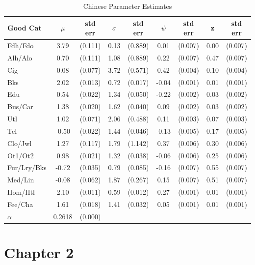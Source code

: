 \begin{table}[!ht]
    \centering
	\begin{tabular}{lcccccccc}
		\hline
		Good Cat & $\mu$ & std err      & $\sigma$ & std err  & $\psi$ & std err & z & std err\\
		\hline \hline
		Fdh/Fdo     &  3.79 & (0.111) & 0.13 & (0.889) &  0.01 & (0.007)& 0.00 & (0.007)\\
		Alh/Alo     &  0.70 & (0.111) & 1.08 & (0.889) &  0.22 & (0.007)& 0.47 & (0.007)\\
		Cig         &  0.08 & (0.077) & 3.72 & (0.571) &  0.42 & (0.004)& 0.10 & (0.004)\\
		Bks         &  2.02 & (0.013) & 0.72 & (0.017) & -0.04 & (0.001)& 0.01 & (0.001)\\
		Edu         &  0.54 & (0.022) & 1.34 & (0.050) & -0.22 & (0.002)& 0.03 & (0.002)\\
		Bus/Car     &  1.38 & (0.020) & 1.62 & (0.040) &  0.09 & (0.002)& 0.03 & (0.002)\\
		Utl         &  1.02 & (0.071) & 2.06 & (0.488) &  0.11 & (0.003)& 0.07 & (0.003)\\
		Tel         & -0.50 & (0.022) & 1.44 & (0.046) & -0.13 & (0.005)& 0.17 & (0.005)\\
		Clo/Jwl     &  1.27 & (0.117) & 1.79 & (1.142) &  0.37 & (0.006)& 0.30 & (0.006)\\
		Ot1/Ot2     &  0.98 & (0.021) & 1.32 & (0.038) & -0.06 & (0.006)& 0.25 & (0.006)\\
		Fur/Lry/Bks & -0.72 & (0.035) & 0.79 & (0.085) & -0.16 & (0.007)& 0.55 & (0.007)\\
		Med/Lin     & -0.08 & (0.062) & 1.87 & (0.267) &  0.15 & (0.007)& 0.51 & (0.007)\\
		Hom/Htl     &  2.10 & (0.011) & 0.59 & (0.012) &  0.27 & (0.001)& 0.01 & (0.001)\\
		Fee/Cha     &  1.61 & (0.018) & 1.41 & (0.032) &  0.05 & (0.001)& 0.01 & (0.001)\\
		\hline
		$\alpha$ & 0.2618 & (0.000) & & & & \\
		\hline
	\end{tabular}
     	\linebreak
    \caption{Chinese Parameter Estimates}
    \label{tab:chnparest}
\end{table}


\clearpage

\chapter{Chapter 2}
\label{sec:ap2}

